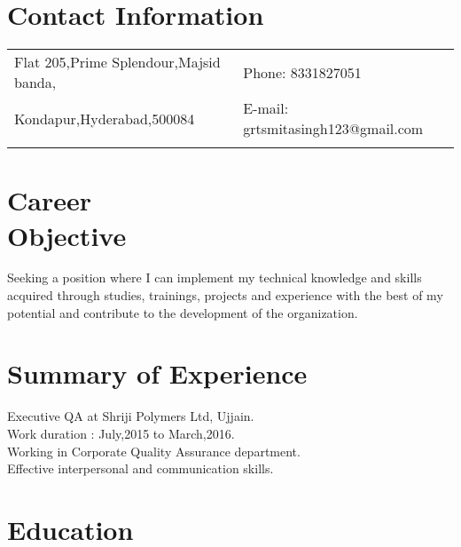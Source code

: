 \documentclass[margin,line]{res}
\begin{document}


\begin{resume}
\section{\sc Contact Information}

\vspace{.05in}
\begin{tabular}{@{}p{3.5in}p{3in}}
Flat 205,Prime Splendour,Majsid banda,                & {Phone:}  8331827051 \\
Kondapur,Hyderabad,500084                               & {E-mail:}  grtsmitasingh123@gmail.com\\
\\
\end{tabular}


\section{\sc Career \\Objective}
Seeking a position where I can implement my technical knowledge and skills acquired through studies, trainings, projects and experience with the best of my potential and contribute to the development of the organization.\\



\section{\sc Summary of Experience}
Executive QA at Shriji Polymers Ltd, Ujjain. \\
Work duration : July,2015 to March,2016.\\
Working in Corporate Quality Assurance department.\\
Eﬀective interpersonal and communication skills.\\



\section{\sc Education}


\end{resume}
\end{document}
